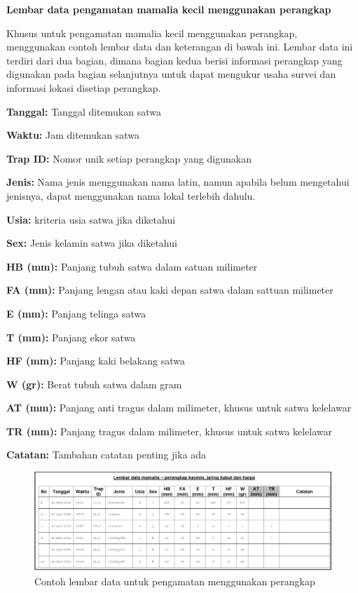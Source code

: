 \documentclass[
]{book}
\begin{document}
\textbf{Lembar data pengamatan mamalia kecil menggunakan perangkap}

Khusus untuk pengamatan mamalia kecil menggunakan perangkap, menggunakan contoh lembar data dan keterangan di bawah ini. Lembar data ini terdiri dari dua bagian, dimana bagian kedua berisi informasi perangkap yang digunakan pada bagian selanjutnya untuk dapat mengukur usaha survei dan informasi lokasi disetiap perangkap.

\textbf{Tanggal:} Tanggal ditemukan satwa

\textbf{Waktu:} Jam ditemukan satwa

\textbf{Trap ID:} Nomor unik setiap perangkap yang digunakan

\textbf{Jenis:} Nama jenis menggunakan nama latin, namun apabila belum mengetahui jenisnya, dapat menggunakan nama lokal terlebih dahulu.

\textbf{Usia:} kriteria usia satwa jika diketahui

\textbf{Sex:} Jenis kelamin satwa jika diketahui

\textbf{HB (mm):} Panjang tubuh satwa dalam satuan milimeter

\textbf{FA (mm):} Panjang lengan atau kaki depan satwa dalam sattuan milimeter

\textbf{E (mm):} Panjang telinga satwa

\textbf{T (mm):} Panjang ekor satwa

\textbf{HF (mm): }Panjang kaki belakang satwa

\textbf{W (gr):} Berat tubuh satwa dalam gram

\textbf{AT (mm): }Panjang anti tragus dalam milimeter, khusus untuk satwa kelelawar

\textbf{TR (mm):} Panjang tragus dalam milimeter, khusus untuk satwa kelelawar

\textbf{Catatan: }Tambahan catatan penting jika ada

\begin{figure}

{\centering \includegraphics[width=1\linewidth]{images/ldm_pk} 

}

\caption{Contoh lembar data untuk pengamatan menggunakan perangkap}\label{fig:ldmpk}
\end{figure}
\end{document}
